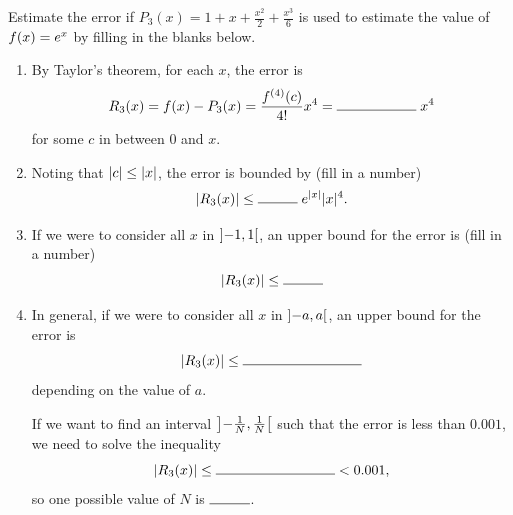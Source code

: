 \documentclass{discussion}
\author{Sections B04 and B06}
\date{Fall 2024}
\begin{document}
\begin{question}
    Estimate the error if \(\displaystyle P_3(x) = 1 + x + \frac{x^2}{2} + \frac{x^3}{6}\) is used to estimate the value of \(f(x) = e^{x}\) by filling in the blanks below.
    \begin{enumerate}
        \item By Taylor's theorem, for each \(x\), the error is
        \begin{equation*}
            R_3(x) = f(x) - P_3(x) = \frac{f^{(4)}(c)}{4!} x^{4} = \rule{2cm}{0.15mm} \; x^{4}
        \end{equation*}
        for some \(c\) in between \(0\) and \(x\).

        \item Noting that \(\lvert c\rvert \leq \lvert x\rvert\), the error is bounded by (fill in a number)
        \begin{equation*}
            \abs{R_3(x)} \leq \rule{1cm}{0.15mm} \; \eu^{\abs{x}} \abs{x}^4.
        \end{equation*}

        \item If we were to consider all \(x\) in \(\ointerval{-1}{1}\), an upper bound for the error is (fill in a number)
        \begin{equation*}
            \abs{R_3(x)} \leq \rule{1cm}{0.15mm}
        \end{equation*}

        \item In general, if we were to consider all \(x\) in \(\ointerval{-a}{a}\), an upper bound for the error is
        \begin{equation*}
            \abs{R_3(x)} \leq \rule{3cm}{0.15mm}
        \end{equation*}
        depending on the value of \(a\).

        If we want to find an interval \(\ointerval[scaled]{-\frac{1}{N}}{\frac{1}{N}}\) such that the error is less than \(0.001\), we need to solve the inequality
        \begin{equation*}
            \abs{R_3(x)} \leq \rule{3cm}{0.15mm} < 0.001,
        \end{equation*}
        so one possible value of \(N\) is \(\rule{1cm}{0.15mm}\).
    \end{enumerate}
\end{question}
\end{document}
